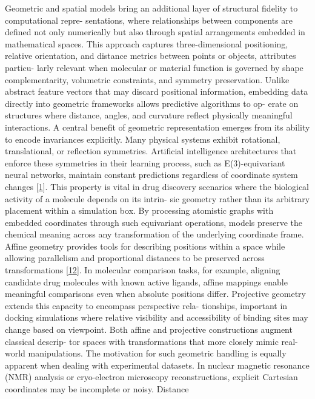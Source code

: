 \documentclass[
]{article}
\begin{document}
Geometric and spatial models bring an additional layer of structural
fidelity to computational repre- sentations, where relationships between
components are defined not only numerically but also through spatial
arrangements embedded in mathematical spaces. This approach captures
three-dimensional positioning, relative orientation, and distance
metrics between points or objects, attributes particu- larly relevant
when molecular or material function is governed by shape
complementarity, volumetric constraints, and symmetry preservation.
Unlike abstract feature vectors that may discard positional information,
embedding data directly into geometric frameworks allows predictive
algorithms to op- erate on structures where distance, angles, and
curvature reflect physically meaningful interactions. A central benefit
of geometric representation emerges from its ability to encode
invariances explicitly. Many physical systems exhibit rotational,
translational, or reflection symmetries. Artificial intelligence
architectures that enforce these symmetries in their learning process,
such as E(3)-equivariant neural networks, maintain constant predictions
regardless of coordinate system changes
{[}\protect\hyperlink{_bookmark41}{1}{]}. This property is vital in drug
discovery scenarios where the biological activity of a molecule depends
on its intrin- sic geometry rather than its arbitrary placement within a
simulation box. By processing atomistic graphs with embedded coordinates
through such equivariant operations, models preserve the chemical
meaning across any transformation of the underlying coordinate frame.
Affine geometry provides tools for describing positions within a space
while allowing parallelism and proportional distances to be preserved
across transformations {[}\protect\hyperlink{_bookmark52}{12}{]}. In
molecular comparison tasks, for example, aligning candidate drug
molecules with known active ligands, affine mappings enable meaningful
comparisons even when absolute positions differ. Projective geometry
extends this capacity to encompass perspective rela- tionships,
important in docking simulations where relative visibility and
accessibility of binding sites may change based on viewpoint. Both
affine and projective constructions augment classical descrip- tor
spaces with transformations that more closely mimic real-world
manipulations. The motivation for such geometric handling is equally
apparent when dealing with experimental datasets. In nuclear magnetic
resonance (NMR) analysis or cryo-electron microscopy reconstructions,
explicit Cartesian coordinates may be incomplete or noisy. Distance
\end{document}
